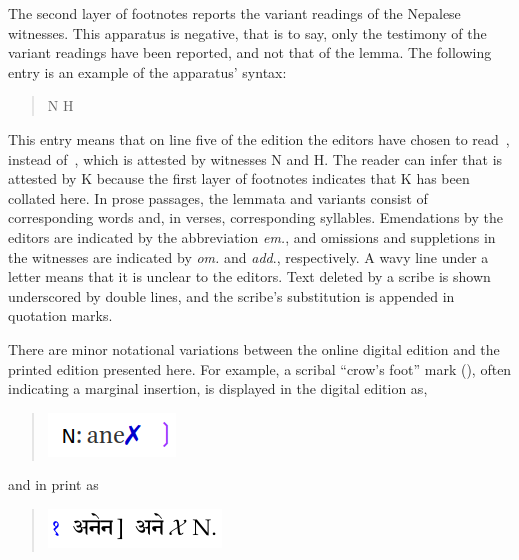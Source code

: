 The second layer of footnotes reports the variant readings of the Nepalese
witnesses. This apparatus is negative, that is to say, only the testimony of
the variant readings have been reported, and not that of the lemma. The
following entry is an example of the apparatus' syntax:
\begin{quote}
    \dev{5 pratanuṃ ]  pratanū} N H 
\end{quote}
This entry means that on line five of the edition the editors have chosen to
read \,, instead of \,, which is attested by
witnesses N and H. The reader can infer that  is attested by K
because the first layer of footnotes indicates that K has been collated here.
In prose passages, the lemmata and variants consist of corresponding words
and, in verses, corresponding syllables. Emendations by the editors are
indicated by the abbreviation \emph{em.}, and omissions and suppletions in the
witnesses are indicated by \emph{om.} and \emph{add}., respectively. A wavy
line under a letter means that it is unclear to the editors. Text deleted by a
scribe is shown underscored by double lines, and the scribe's substitution is
appended in quotation marks.

There are minor notational variations between the online digital edition and the
printed edition presented here.  For example, a scribal “crow's foot” mark
(), often indicating a marginal insertion, is displayed in the digital 
edition as,
\begin{quote}
    \includegraphics[draft=false,width=.19\linewidth]{media/ane-online}
    \end{quote}
and in print as
\begin{quote}
    \includegraphics[draft=false,width=.24\linewidth]{media/ane-printed}
    \end{quote}




